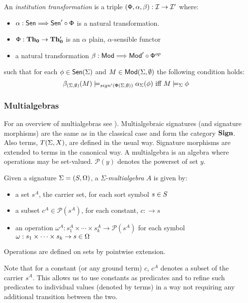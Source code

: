\documentclass[10pt]{article}
\begin{document}
\begin{definition}
\begin{enumerate}
An {\em institution transformation} \cite{system} is a triple  $({\sf {\Phi}},\alpha,\beta): {\mathcal{I}} \to {\mathcal{I'}}$ where:
\begin{itemize}\MyLPar
	\item $\alpha: {\sf {Sen}} \mathrel{\Longrightarrow} {\sf {Sen}}' \circ {\sf {\Phi}}$ is a natural transformation.
	\item ${\sf {\Phi}}: {\bf Th_0} \to {\bf Th_0'}$ is an $\alpha$ plain, $\alpha$-sensible functor %
\item a natural transformation $\beta: {\sf {Mod}} \mathrel{\Longrightarrow} {\sf {Mod}}' \circ {\sf {\Phi}}^{op}$
\end{itemize}
such that for each $\phi \in {\sf {Sen}}(\Sigma)$ and $ M \in
{\sf {Mod}}(\Sigma,\emptyset)$ the following condition holds:
\[ \beta_{(\Sigma,\emptyset)}(M) \models_{sign'({\sf {\Phi}}(\Sigma,\emptyset))}
\alpha_{\Sigma}(\phi) \mbox{ iff } M \models_{\Sigma} \phi \]
\end{enumerate}
\end{definition}

\subsubsection*{Multialgebras}
For an overview of multialgebras see \cite{multi,catrel}). 
Multialgebraic signatures  (and signature morphisms) are the same as in the
classical case and form the category ${\bf Sign}$.
Also terms, $T(\Sigma,X)$, are defined in the usual way. 
Signature morphisms are extended to terms in the canonical way.
A multialgebra is an algebra where operations may be
set-valued. ${\mathcal{P}}(y)$ denotes the powerset of set $y$.

\begin{definition}\label{def:ma}
Given a signature $\Sigma=({S},\Omega)$, a $\Sigma$-{\em multialgebra} $A$ is given by:
\begin{itemize}\MyLPar
\item  a set $s^A$, the carrier set, for each sort symbol $s\in{S}$
\item  a subset $ c^A \in {\mathcal{P}}(s^A)$, for each constant, $c:\to s$
\item an operation $\omega^A : s_1^A \times \cdots \times s_k^A \to {\mathcal{P}}(s^A)$
	for each symbol $\omega : s_1\times\cdots\times s_k \to s \in \Omega$
\end{itemize}
Operations are defined on sets by pointwise extension.
\end{definition}
Note that for a constant (or any ground term) $c$, $c^A$ denotes a subset of the
carrier $s^A$. This allows us to use constants as predicates and to refine
such predicates to individual values (denoted by terms) in a way not requiring any additional
transition between the two. 
\end{document}
